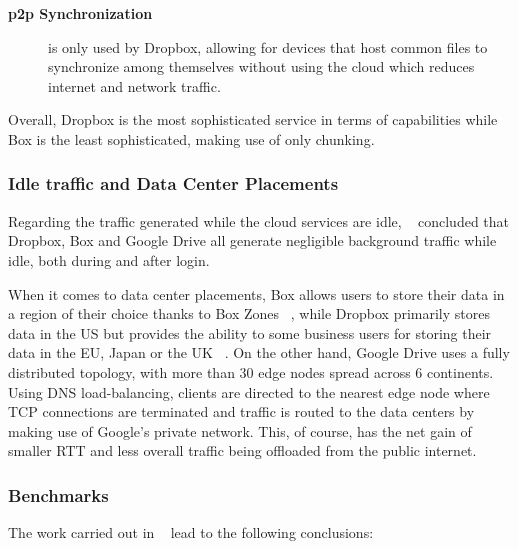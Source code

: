 \begin{description}
    \item[\textbf{\ac{p2p} Synchronization}] is only used by Dropbox, allowing for devices that host common files to synchronize among themselves without using the cloud which reduces internet and network traffic.
\end{description}

Overall, Dropbox is the most sophisticated service in terms of capabilities while Box is the least sophisticated, making use of only chunking.

\subsubsection{Idle traffic and Data Center Placements}
Regarding the traffic generated while the cloud services are idle, ~\cite{personal1} concluded that Dropbox, Box and Google Drive all generate negligible background traffic while idle, both during and after login. 

When it comes to data center placements, Box allows users to store their data in a region of their choice thanks to Box Zones ~\cite{box}, while Dropbox primarily stores data in the US but provides the ability to some business users for storing their data in the EU, Japan or the UK ~\cite{dropbox_data_centers}. On the other hand, Google Drive uses a fully distributed topology, with more than 30 edge nodes spread across 6 continents. Using DNS load-balancing, clients are directed to the nearest edge node where TCP connections are terminated and traffic is routed to the data centers by making use of Google's private network. This, of course, has the net gain of smaller RTT and less overall traffic being offloaded from the public internet.

\subsubsection{Benchmarks}

The work carried out in ~\cite{personal1} lead to the following conclusions:

